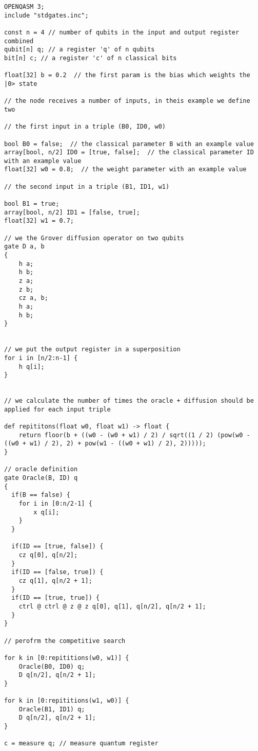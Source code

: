 \documentclass{article}
\begin{document}
\begin{lstlisting}
OPENQASM 3;
include "stdgates.inc";

const n = 4 // number of qubits in the input and output register combined
qubit[n] q; // a register 'q' of n qubits
bit[n] c; // a register 'c' of n classical bits

float[32] b = 0.2  // the first param is the bias which weights the |0> state

// the node receives a number of inputs, in theis example we define two

// the first input in a triple (B0, ID0, w0)

bool B0 = false;  // the classical parameter B with an example value
array[bool, n/2] ID0 = [true, false];  // the classical parameter ID with an example value
float[32] w0 = 0.8;  // the weight parameter with an example value

// the second input in a triple (B1, ID1, w1)

bool B1 = true;
array[bool, n/2] ID1 = [false, true];
float[32] w1 = 0.7;

// we the Grover diffusion operator on two qubits
gate D a, b
{
    h a;
    h b;
    z a;
    z b;
    cz a, b;
    h a;
    h b;
}


// we put the output register in a superposition
for i in [n/2:n-1] {
    h q[i];
}


// we calculate the number of times the oracle + diffusion should be applied for each input triple

def repititons(float w0, float w1) -> float {
    return floor(b + ((w0 - (w0 + w1) / 2) / sqrt((1 / 2) (pow(w0 - ((w0 + w1) / 2), 2) + pow(w1 - ((w0 + w1) / 2), 2)))));
}

// oracle definition
gate Oracle(B, ID) q
{
  if(B == false) {
    for i in [0:n/2-1] {
        x q[i];
    }
  }

  if(ID == [true, false]) {
    cz q[0], q[n/2];
  }
  if(ID == [false, true]) {
    cz q[1], q[n/2 + 1];
  }
  if(ID == [true, true]) {
    ctrl @ ctrl @ z @ z q[0], q[1], q[n/2], q[n/2 + 1];
  }
}

// perofrm the competitive search

for k in [0:repititions(w0, w1)] { 
    Oracle(B0, ID0) q;
    D q[n/2], q[n/2 + 1]; 
}

for k in [0:repititions(w1, w0)] { 
    Oracle(B1, ID1) q;
    D q[n/2], q[n/2 + 1]; 
}

c = measure q; // measure quantum register
\end{lstlisting}
\end{document}
